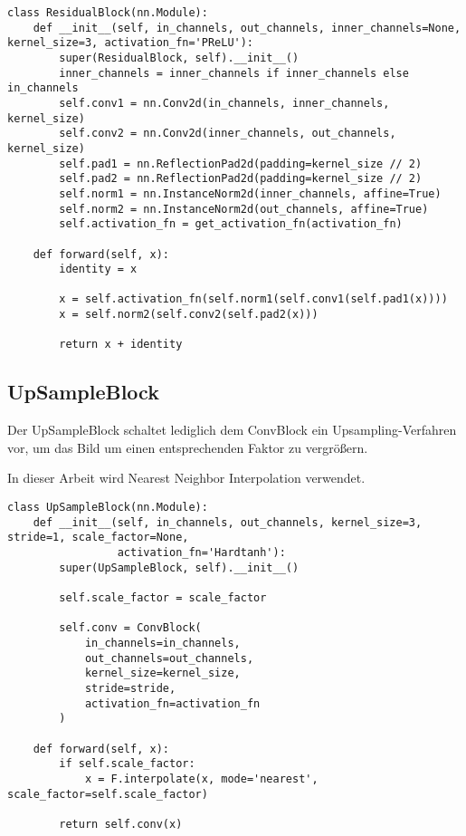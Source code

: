 \begin{listing}[H]
\begin{verbatim}
class ResidualBlock(nn.Module):
    def __init__(self, in_channels, out_channels, inner_channels=None, kernel_size=3, activation_fn='PReLU'):
        super(ResidualBlock, self).__init__()
        inner_channels = inner_channels if inner_channels else in_channels
        self.conv1 = nn.Conv2d(in_channels, inner_channels, kernel_size)
        self.conv2 = nn.Conv2d(inner_channels, out_channels, kernel_size)
        self.pad1 = nn.ReflectionPad2d(padding=kernel_size // 2)
        self.pad2 = nn.ReflectionPad2d(padding=kernel_size // 2)
        self.norm1 = nn.InstanceNorm2d(inner_channels, affine=True)
        self.norm2 = nn.InstanceNorm2d(out_channels, affine=True)
        self.activation_fn = get_activation_fn(activation_fn)

    def forward(self, x):
        identity = x

        x = self.activation_fn(self.norm1(self.conv1(self.pad1(x))))
        x = self.norm2(self.conv2(self.pad2(x)))

        return x + identity
\end{verbatim}
\end{listing}

\pagebreak

\subsection{UpSampleBlock}

Der UpSampleBlock schaltet lediglich dem ConvBlock ein Upsampling-Verfahren vor, um das Bild um einen entsprechenden Faktor zu vergrößern.

In dieser Arbeit wird Nearest Neighbor Interpolation  verwendet.


\begin{listing}[H]
\begin{verbatim}
class UpSampleBlock(nn.Module):
    def __init__(self, in_channels, out_channels, kernel_size=3, stride=1, scale_factor=None,
                 activation_fn='Hardtanh'):
        super(UpSampleBlock, self).__init__()

        self.scale_factor = scale_factor

        self.conv = ConvBlock(
            in_channels=in_channels,
            out_channels=out_channels,
            kernel_size=kernel_size,
            stride=stride,
            activation_fn=activation_fn
        )

    def forward(self, x):
        if self.scale_factor:
            x = F.interpolate(x, mode='nearest', scale_factor=self.scale_factor)

        return self.conv(x)
\end{verbatim}
\end{listing}

